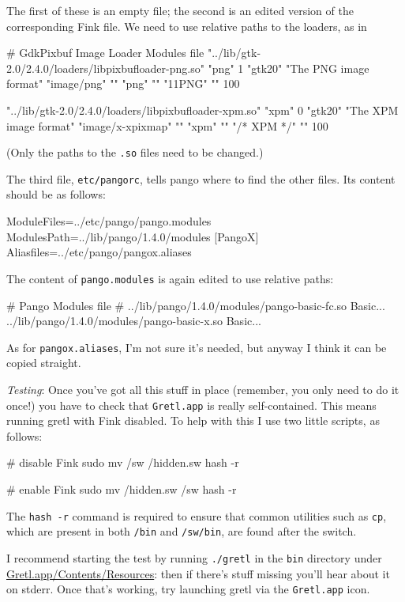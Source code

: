 \documentclass{article}
\begin{document}
The first of these is an empty file; the second is an edited
version of the corresponding Fink file.  We need to use relative
paths to the loaders, as in

\begin{code}
# GdkPixbuf Image Loader Modules file
"../lib/gtk-2.0/2.4.0/loaders/libpixbufloader-png.so"
"png" 1 "gtk20" "The PNG image format"
"image/png" ""
"png" ""
"\211PNG\r\n{}\n" "" 100

"../lib/gtk-2.0/2.4.0/loaders/libpixbufloader-xpm.so"
"xpm" 0 "gtk20" "The XPM image format"
"image/x-xpixmap" ""
"xpm" ""
"/* XPM */" "" 100
\end{code}

(Only the paths to the \texttt{.so} files need to be changed.)

The third file, \texttt{etc/pangorc}, tells pango where to find the
other files.  Its content should be as follows:

\begin{code}
[Pango]
ModuleFiles=../etc/pango/pango.modules
ModulesPath=../lib/pango/1.4.0/modules
[PangoX]
Aliasfiles=../etc/pango/pangox.aliases
\end{code}

The content of \texttt{pango.modules} is again edited
to use relative paths:

\begin{code}
# Pango Modules file
#
../lib/pango/1.4.0/modules/pango-basic-fc.so Basic...
../lib/pango/1.4.0/modules/pango-basic-x.so Basic...
\end{code}

As for \texttt{pangox.aliases}, I'm not sure it's needed, but anyway I
think it can be copied straight.

\textit{Testing}: Once you've got all this stuff in place (remember,
you only need to do it once!) you have to check that
\texttt{Gretl.app} is really self-contained.  This means running gretl
with Fink disabled.  To help with this I use two little scripts, as
follows:

\begin{code}
# disable Fink
sudo mv /sw /hidden.sw
hash -r

# enable Fink
sudo mv /hidden.sw /sw
hash -r
\end{code}

The \texttt{hash -r} command is required to ensure that common
utilities such as \texttt{cp}, which are present in both \texttt{/bin}
and \texttt{/sw/bin}, are found after the switch.

I recommend starting the test by running \texttt{./gretl} in the
\texttt{bin} directory under \url{Gretl.app/Contents/Resources}: then
if there's stuff missing you'll hear about it on stderr.  Once that's
working, try launching gretl via the \texttt{Gretl.app} icon.
\end{document}
